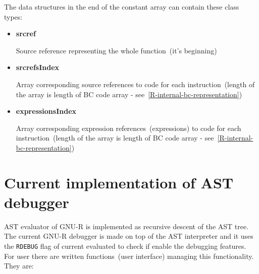 \documentclass[thesis=M,english]{FITthesis}[2018/10/20]
\newcommand{\code}[1]{\texttt{#1}}
\begin{document}
The data structures in the end of the constant array can contain these class types:

\begin{itemize}
	\item \textbf{srcref}

Source reference representing the whole function~(it's beginning)

	\item \textbf{srcrefsIndex}

Array corresponding source references to code for each instruction~(length of the array is length of BC code array - see~\ref{R-internal-bc-representation})

	\item \textbf{expressionsIndex}

Array corresponding expression references~(expressions) to code for each instruction~(length of the array is length of BC code array - see~\ref{R-internal-bc-representation})

\end{itemize}

\section{Current implementation of AST debugger}\label{AST-debugger}

AST evaluator of GNU-R is implemented as recursive descent of the AST tree.
The current GNU-R debugger is made on top of the AST interpreter and it uses the \code{RDEBUG} flag of current evaluated to check if enable the debugging features. For user there are written functions~(user interface) managing this functionality. They are:
\end{document}
